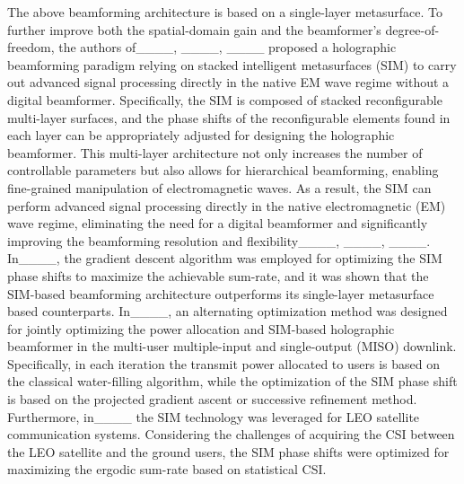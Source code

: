 The above beamforming architecture is based on a single-layer metasurface. To further improve both the spatial-domain gain and the beamformer's degree-of-freedom, the authors of____, ____, ____ proposed a holographic beamforming paradigm relying on stacked intelligent metasurfaces (SIM) to carry out advanced signal processing directly in the native EM wave regime without a digital beamformer. Specifically, the SIM is composed of stacked reconfigurable multi-layer surfaces, and the phase shifts of the reconfigurable elements found in each layer can be appropriately adjusted for designing the holographic beamformer. This multi-layer architecture not only increases the number of controllable parameters but also allows for hierarchical beamforming, enabling fine-grained manipulation of electromagnetic waves. As a result, the SIM can perform advanced signal processing directly in the native electromagnetic (EM) wave regime, eliminating the need for a digital beamformer and significantly improving the beamforming resolution and flexibility____, ____, ____. In____, the gradient descent algorithm was employed for optimizing the SIM phase shifts to maximize the achievable sum-rate, and it was shown that the SIM-based beamforming architecture outperforms its single-layer metasurface based counterparts. In____, an alternating optimization method was designed for jointly optimizing the power allocation and SIM-based holographic beamformer in the multi-user multiple-input and single-output (MISO) downlink. Specifically, in each iteration the transmit power allocated to users is based on the classical water-filling algorithm, while the optimization of the SIM phase shift is based on the projected gradient ascent or successive refinement method. Furthermore, in____ the SIM technology was leveraged for LEO satellite communication systems. Considering the challenges of acquiring the CSI between the LEO satellite and the ground users, the SIM phase shifts were optimized for maximizing the ergodic sum-rate based on statistical CSI.